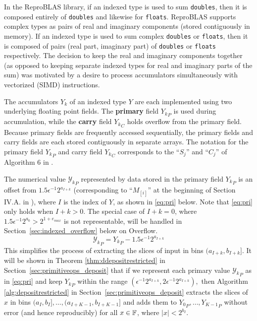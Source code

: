       In the ReproBLAS library, if an indexed type is used to sum
      \texttt{doubles}, then it is composed entirely of \texttt{doubles} and
      likewise for \texttt{floats}. ReproBLAS supports complex types as pairs
      of real and imaginary components (stored contiguously in memory). If an
      indexed type is used to sum complex \texttt{doubles} or \texttt{floats},
      then it is composed of pairs (real part, imaginary part) of
      \texttt{doubles} or \texttt{floats} respectively. The decision to keep
      the real and imaginary components together (as opposed to keeping
      separate indexed types for real and imaginary parts of the sum) was
      motivated by a desire to process accumulators simultaneously with
      vectorized (SIMD) instructions.

      The accumulators $Y_k$ of an indexed type $Y$ are each implemented using
      two underlying floating point fields. The \textbf{primary} field
      ${Y_k}_P$ is used during accumulation, while the \textbf{carry} field
      ${Y_k}_C$ holds overflow from the primary field. Because primary fields
      are frequently accessed sequentially, the primary fields and carry fields
      are each stored contiguously in separate arrays. The notation for the
      primary field ${Y_k}_P$ and carry field ${Y_k}_C$ corresponds to the
      ``$S_j$'' and ``$C_j$'' of Algorithm $6$ in \cite{repsum}.

      The numerical value ${\mathcal{Y}_k}_P$ represented by data stored in the
      primary field ${Y_k}_P$ is an offset from $1.5\epsilon^{-1}2^{a_{I + k}}$
      (corresponding to ``$M_{[i]}$'' at the beginning of Section IV.A. in
      \cite{repsum}), where $I$ is the index of $Y$, as shown in
      \eqref{eq:pri} below.
      Note that \eqref{eq:pri} only holds when $I+k > 0$. The special case of $I+k=0$,
      where $1.5\epsilon^{-1}2^{a_0} > 2^{1+e_{max}}$ is not representable,
      will be handled in Section~\ref{sec:indexed_overflow} below on Overflow.
      \begin{equation}
        {\mathcal{Y}_k}_P = {Y_k}_P - 1.5\epsilon^{-1}2^{a_{I + k}}
        \label{eq:pri}
      \end{equation}
      This simplifies the process of extracting the slices of input in bins
      $(a_{I + k}, b_{I + k}]$. It will be shown in Theorem
      \ref{thm:ddepositrestricted} in Section~\ref{sec:primitiveops_deposit}
      that if we represent each primary value ${\mathcal{Y}_k}_P$ as in
      \eqref{eq:pri} and keep ${Y_k}_P$ within the range
      \(
      	(\epsilon^{-1} 2^{a_{I + k}}, 2 \epsilon^{-1} 2^{a_{I + k}}),
      \)
      then Algorithm
      \ref{alg:depositrestricted} in Section~\ref{sec:primitiveops_deposit}
      extracts the slices of $x$ in bins 
      \(
      	(a_I, b_I], \ldots, (a_{I + K - 1}, b_{I + K - 1}]
      \)
      and adds them to ${Y_0}_P, \ldots, {Y_{K - 1}}_P$ without error
      (and hence reproducibly) for all $x \in \mathbb{F}$, where $|x| < 2^{b_I}$.

